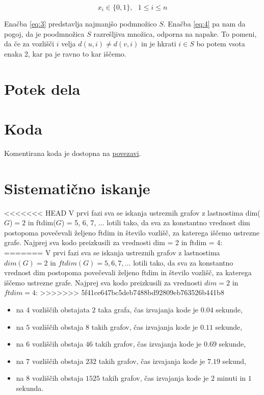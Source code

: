 \documentclass[12pt]{article}
\begin{document}
\begin{equation}
    x_i \in \{0, 1\}, \text{ } 1 \leq i \leq n
\label{eq:5}
\end{equation}

Enačba \eqref{eq:3} predstavlja najmanjšo podmnožico $S.$ Enačba \eqref{eq:4} pa nam da pogoj, da
je poodmnožica $S$ razrešljiva množica, odporna na napake. To pomeni, da če za vozlišči $i$ velja 
$d(u, i) \neq d(v, i)$ in je hkrati $i \in S$ bo potem vsota enaka 2, kar pa je ravno to kar iščemo.

\section{Potek dela}


\section{Koda}
Komentirana koda je dostopna na \href{https://github.com/HanaSamsa/Problem-metricnih-dimenzij-odpornih-na-napake.git}{povezavi}.

\section{Sistematično iskanje}

<<<<<<< HEAD
V prvi fazi sva se iskanja ustreznih grafov z lastnostima dim($G$)$ =2$ in ftdim($G$) = 5, 6, 7, ... 
lotili tako, da sva za konstantno vrednost dim postopoma povečevali željeno ftdim in število vozlišč, za 
katerega iščemo ustrezne grafe. Najprej sva kodo preizkusili za vrednosti dim = 2 in ftdim = 4:
=======
V prvi fazi sva se iskanja ustreznih grafov z lastnostima $dim(G) =2$ in $ftdim(G) = 5, 6, 7, ...$ lotili tako, da sva za konstantno vrednost dim postopoma povečevali željeno ftdim in število vozlišč, za katerega iščemo ustrezne grafe. Najprej sva kodo preizkusili za vrednosti $dim = 2$ in $ftdim = 4$:
>>>>>>> 5f41ce647bc5deb7488bd92809eb763526b441b8
\begin{itemize}
    \item na $4$ vozliščih obstajata $2$ taka grafa, čas izvajanja kode je $0.04$ sekunde,
    \item na $5$ vozliščih obstaja $8$ takih grafov, čas izvajanja kode je $0.11$ sekunde,
    \item na $6$ vozliščih obstaja $46$ takih grafov, čas izvajanja kode je $0.69$ sekunde,
    \item na $7$ vozliščih obstaja $232$ takih grafov, čas izvajanja kode je $7.19$ sekund,
    \item na $8$ vozliščih obstaja $1525$ takih grafov, čas izvajanja kode je $2$ minuti in $1$ sekunda.
\end{itemize}
\end{document}
